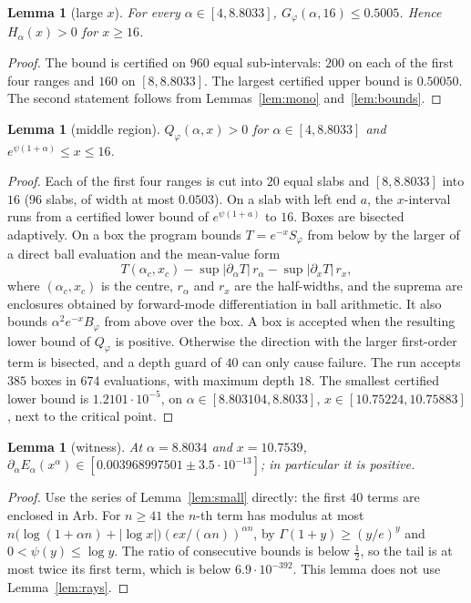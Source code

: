 \documentclass[11pt,a4paper]{article}
\theoremstyle{plain}
\newtheorem{lemma}[theorem]{Lemma}
\theoremstyle{remark}
\begin{document}
\begin{lemma}[large $x$]\label{lem:tail16}
For every $\alpha\in[4,8.8033]$, $G_\varphi(\alpha,16)\le0.5005$. Hence $H_\alpha(x)>0$ for
$x\ge16$.
\end{lemma}
\begin{proof}
The bound is certified on $960$ equal sub-intervals: $200$ on each of the first four ranges and
$160$ on $[8,8.8033]$. The largest certified upper bound is $0.50050$. The second statement
follows from Lemmas~\ref{lem:mono} and~\ref{lem:bounds}.
\end{proof}

\begin{lemma}[middle region]\label{lem:middle}
$Q_\varphi(\alpha,x)>0$ for $\alpha\in[4,8.8033]$ and $e^{\psi(1+\alpha)}\le x\le16$.
\end{lemma}
\begin{proof}
Each of the first four ranges is cut into $20$ equal slabs and $[8,8.8033]$ into $16$ ($96$
slabs, of width at most $0.0503$). On a slab with left end
$a$, the $x$-interval runs from a certified lower bound of $e^{\psi(1+a)}$ to $16$. Boxes are
bisected adaptively. On a box the program bounds $T=e^{-x}S_\varphi$ from below by the larger of a
direct ball evaluation and the mean-value form
\[
 T(\alpha_c,x_c)-\sup|\partial_\alpha T|\,r_\alpha-\sup|\partial_xT|\,r_x ,
\]
where $(\alpha_c,x_c)$ is the centre, $r_\alpha$ and $r_x$ are the half-widths, and the suprema are
enclosures obtained by forward-mode differentiation in ball arithmetic. It also bounds
$\alpha^2e^{-x}B_\varphi$ from above over the box. A box is accepted when the resulting lower bound
of $Q_\varphi$ is positive. Otherwise the direction with the larger first-order term is bisected,
and a depth guard of $40$ can only cause failure. The run accepts $385$ boxes in $674$
evaluations, with maximum depth $18$. The smallest certified lower bound is $1.2101\cdot10^{-5}$, on
$\alpha\in[8.803104,8.8033]$, $x\in[10.75224,10.75883]$, next to the critical point.
\end{proof}

\begin{lemma}[witness]\label{lem:witness}
At $\alpha=8.8034$ and $x=10.7539$,
$\partial_\alpha E_\alpha(x^\alpha)\in[0.003968997501\pm3.5\cdot10^{-13}]$; in particular it is
positive.
\end{lemma}
\begin{proof}
Use the series of Lemma~\ref{lem:small} directly: the first $40$ terms are enclosed in Arb. For
$n\ge41$ the $n$-th term has modulus at most $n\bigl(\log(1+\alpha n)+|\log x|\bigr)(ex/(\alpha n))^{\alpha n}$,
by $\Gamma(1+y)\ge(y/e)^y$ and $0<\psi(y)\le\log y$. The ratio of consecutive bounds is below
$\frac12$, so the tail is at most twice its first term, which is below $6.9\cdot10^{-392}$. This
lemma does not use Lemma~\ref{lem:rays}.
\end{proof}
\end{document}
